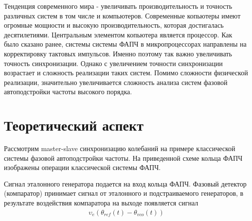 \documentclass[a4paper,14pt]{extarticle} %
\begin{document}
Тенденция современного мира - увеличивать производительность и точность различных систем в том числе и компьютеров. Современные копьютеры имеют огромные мощности и высокую производительность, которая достигалась десятилетиями. Центральным элементом копьютера является процессор. Как было сказано ранее, системы системы ФАПЧ в микропроцессорах направлены на корректировку тактовых импульсов. Именно поэтому так важно увеличивать точность синхронизации. Однако с увеличением точности синхронизации возрастает и сложность реализации таких систем. Помимо сложности физической реализации, значительно увеличивается сложность анализа систем фазовой автоподстройки частоты высокого порядка.

\newpage
\section{Теоретический аспект}
Рассмотрим master-slave синхронизацию колебаний на примере классической системы фазовой автоподстройки частоты. На приведенной схеме кольца ФАПЧ изображены операции классической системы ФАПЧ.
\begin{center}
\end{center}
Сигнал эталонного генератора подается на вход кольца ФАПЧ. Фазовый детектор (компаратор) принимает сигнал от эталонного и подстраиваемого генераторов, в результате воздействия компаратора на выходе появляется сигнал
 \begin{equation*}
 \begin{aligned}
\upsilon_e(\theta_{ref}(t) - \theta_{vco}(t))
 \end{aligned}
\end{equation*}
\end{document}
